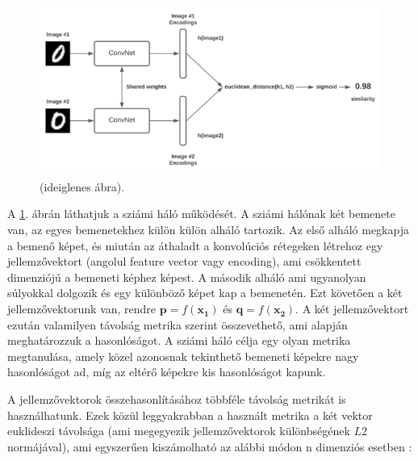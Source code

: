 
\begin{figure}[ht]
	\centering
	\includegraphics[width=1\columnwidth]{figures/siamese.png}
	\caption{(ideiglenes ábra).}
	\label{fig:siamese}
\end{figure}

A \ref{fig:siamese}. ábrán láthatjuk a sziámi háló működését. A sziámi hálónak két bemenete van, az egyes bemenetekhez külön külön alháló tartozik. Az első alháló megkapja a bemenő képet, és miután az áthaladt a konvolúciós rétegeken létrehoz egy jellemzővektort (angolul feature vector vagy encoding), ami csökkentett dimenziójú a bemeneti képhez képest. A második alháló ami ugyanolyan súlyokkal dolgozik és egy különböző képet kap a bemenetén. Ezt követően a két jellemzővektorunk van, rendre $\mathbf{p} = f(\mathbf{x_1})$ és $\mathbf{q} = f(\mathbf{x_2})$. A két jellemzővektort ezután valamilyen távolság metrika szerint összevethető, ami alapján meghatározzuk a hasonlóságot. A sziámi háló célja egy olyan metrika megtanulása, amely közel azonosnak tekinthető bemeneti képekre nagy hasonlóságot ad, míg az eltérő képekre kis hasonlóságot kapunk.

A jellemzővektorok összehasonlításához többféle távolság metrikát is használhatunk. Ezek közül leggyakrabban a használt metrika a két vektor euklideszi távolsága (ami megegyezik jellemzővektorok különbségének $L2$ normájával), ami egyszerűen kiszámolható az alábbi módon n dimenziós esetben \cite{tabak2014geometry}:

